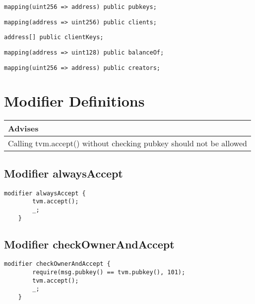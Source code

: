 \begin{lstlisting}[firstnumber=33]
	mapping(uint256 => address) public pubkeys;
\end{lstlisting}

\begin{lstlisting}[firstnumber=34]
	mapping(address => uint256) public clients;
\end{lstlisting}

\begin{lstlisting}[firstnumber=35]
	address[] public clientKeys;
\end{lstlisting}

\begin{lstlisting}[firstnumber=37]
	mapping(address => uint128) public balanceOf;
\end{lstlisting}

\begin{lstlisting}[firstnumber=38]
	mapping(uint256 => address) public creators;
\end{lstlisting}

\section{Modifier Definitions}


\ifsoldraft
\noindent\begin{tabular}{|p{12cm}|}\hline
\rowcolor{green}Advises
\\\hline
Calling tvm.accept() without checking pubkey should not be allowed
\\\hline\end{tabular}
\fi

\subsection{Modifier alwaysAccept}


\begin{lstlisting}[firstnumber=45]
	modifier alwaysAccept {
		tvm.accept();
		_;
	}
\end{lstlisting}

\subsection{Modifier checkOwnerAndAccept}


\begin{lstlisting}[firstnumber=51]
	modifier checkOwnerAndAccept {
		require(msg.pubkey() == tvm.pubkey(), 101);
		tvm.accept();
		_;
	}
\end{lstlisting}

